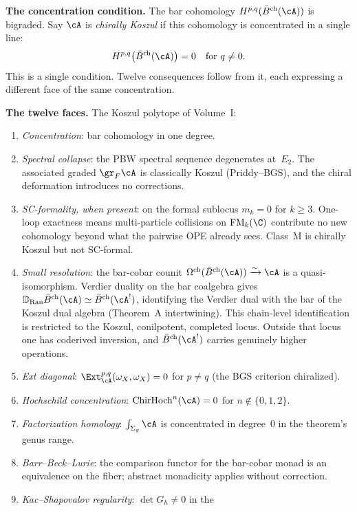 \medskip\noindent\textbf{The concentration condition.}\enspace
The bar cohomology $H^{p,q}(\barBch(\cA))$ is bigraded. Say $\cA$
is \emph{chirally Koszul} if this cohomology is concentrated in a
single line:
\[
H^{p,q}\bigl(\barBch(\cA)\bigr) = 0 \quad \text{for } q \neq 0.
\]
This is a single condition. Twelve consequences follow from it,
each expressing a different face of the same concentration.

\medskip\noindent\textbf{The twelve faces.}\enspace
The Koszul polytope of Volume~I:
\begin{enumerate}[label=\textup{(\roman*)},leftmargin=2em,itemsep=2pt]
\item \emph{Concentration}: bar cohomology in one degree.
\item \emph{Spectral collapse}: the PBW spectral sequence degenerates
 at~$E_2$. The associated graded $\gr_F \cA$ is classically Koszul
 (Priddy--BGS), and the chiral deformation introduces no corrections.
\item \emph{SC-formality, when present}: on the formal sublocus
$m_k = 0$ for $k \geq 3$. One-loop exactness means multi-particle
collisions on $\FM_k(\C)$ contribute no new cohomology beyond what
the pairwise OPE already sees.  Class~M is chirally Koszul but not
SC-formal.
\item \emph{Small resolution}: the bar-cobar counit
 $\Omegach(\barBch(\cA)) \xrightarrow{\sim} \cA$ is a
 quasi-isomorphism. Verdier duality on the bar coalgebra gives
 $\mathbb{D}_{\operatorname{Ran}} \barBch(\cA) \simeq
 \barBch(\cA^!)$, identifying the Verdier dual with the bar of the
 Koszul dual algebra (Theorem~A intertwining).
 This chain-level identification is restricted to the Koszul,
 conilpotent, completed locus.  Outside that locus one has coderived
 inversion, and $\barBch(\cA^!)$ carries genuinely higher operations.
\item \emph{Ext diagonal}: $\Ext^{p,q}_\cA(\omega_X, \omega_X) = 0$
 for $p \neq q$ (the BGS criterion chiralized).
\item \emph{Hochschild concentration}:
 $\mathrm{ChirHoch}^n(\cA) = 0$ for $n \notin \{0, 1, 2\}$.
\item \emph{Factorization homology}: $\int_{\Sigma_g}\cA$ is
 concentrated in degree~$0$ in the theorem's genus range.
\item \emph{Barr--Beck--Lurie}: the comparison functor for the
 bar-cobar monad is an equivalence on the fiber; abstract monadicity
 applies without correction.
\item \emph{Kac--Shapovalov regularity}: $\det G_h \neq 0$ in the

\end{enumerate}
